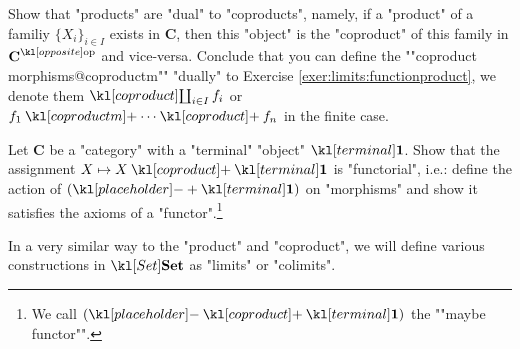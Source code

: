 \documentclass[main.tex]{subfiles}
\begin{document}
\begin{exer}\label{exer:limits:proddualcoprod}
    Show that "products" are "dual" to "coproducts", namely, if a "product" of a familiy $\{X_i\}_{i \in I}$ exists in $\mathbf{C}$, then this "object" is the "coproduct" of this family in $\op{\mathbf{C}}$ and vice-versa. \AP Conclude that you can define the ""coproduct morphisms@coproductm"" "dually" to Exercise \ref{exer:limits:functionproduct}, we denote them $\Coproduct_{i \in I}f_i$ or $f_1 \coproductm \cdots \coproduct f_n$ in the finite case.
\end{exer}
\begin{exer}\label{exer:limits:maybefunctor}%
    Let $\mathbf{C}$ be a "category" with a "terminal" "object" $\terminal$. Show that the assignment $X \mapsto X\coproduct\terminal$ is "functorial", i.e.: define the action of $(\placeholder+\terminal)$ on "morphisms" and show it satisfies the axioms of a "functor".\footnote{\AP We call $(\placeholder\coproduct\terminal)$ the ""maybe functor"".}
\end{exer}

In a very similar way to the "product" and "coproduct", we will define various constructions in $\catSet$ as "limits" or "colimits".
\end{document}
